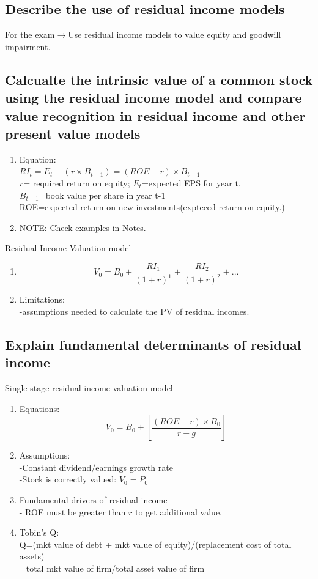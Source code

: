 \documentclass{article}
\newcommand{\be}{\begin{enumerate}}
\newcommand{\ee}{\end{enumerate}}
\newcommand{\ra}{$\rightarrow$}
\begin{document}
\subsection{Describe the use of residual income models}
For the exam\ra Use residual income models to value equity and goodwill impairment.
\subsection{Calcualte the intrinsic value of a common stock using the residual income model
and compare value recognition in residual income and other present value models}
\be
    \item Equation:
        \\$RI_t=E_t-(r\times B_{t-1})=(ROE-r)\times B_{t-1}$
        \\ $r$= required return on equity; $E_t$=expected EPS for year t.
        \\ $B_{t-1}$=book value per share in year t-1
        \\ ROE=expected return on new investments(expteced return on equity.)
    \item NOTE: Check examples in Notes.
\ee
Residual Income Valuation model
\be
    \item 
        $$
            V_0=B_0+ \frac{RI_1}{(1+r)^1}+\frac{RI_2}{(1+r)^2}+...
        $$
    \item Limitations:
        \\-assumptions needed to calculate the PV of residual incomes.
\ee 
\subsection{Explain fundamental determinants of residual income}
Single-stage residual income valuation model
\be
    \item Equations:
        $$
            V_0=B_0+[\frac{(ROE-r)\times B_0}{r-g}]
        $$
    \item Assumptions:
        \\-Constant dividend/earnings growth rate
        \\-Stock is correctly valued: $V_0=P_0$
    \item Fundamental drivers of residual income
        \\- ROE must be greater than $r$ to get additional value.
    \item Tobin's Q:
        \\Q=(mkt value of debt + mkt value of equity)/(replacement cost of total assets)
        \\=total mkt value of firm/total asset value of firm
\ee
\end{document}
